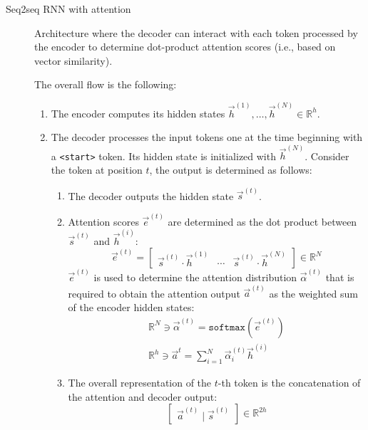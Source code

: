 \begin{description}
    \item[Seq2seq RNN with attention] 
        Architecture where the decoder can interact with each token processed by the encoder to determine dot-product attention scores (i.e., based on vector similarity).

        The overall flow is the following:
        \begin{enumerate}
            \item The encoder computes its hidden states $\vec{h}^{(1)}, \dots, \vec{h}^{(N)} \in \mathbb{R}^{h}$.
            \item The decoder processes the input tokens one at the time beginning with a \texttt{<start>} token. Its hidden state is initialized with $\vec{h}^{(N)}$. Consider the token at position $t$, the output is determined as follows:
            \begin{enumerate}
                \item The decoder outputs the hidden state $\vec{s}^{(t)}$.
                \item Attention scores $\vec{e}^{(t)}$ are determined as the dot product between $\vec{s}^{(t)}$ and $\vec{h}^{(i)}$:
                \[ 
                    \vec{e}^{(t)} = 
                        \begin{bmatrix}
                            \vec{s}^{(t)} \cdot \vec{h}^{(1)} & 
                            \cdots &
                            \vec{s}^{(t)} \cdot \vec{h}^{(N)} 
                        \end{bmatrix} \in \mathbb{R}^{N} 
                \]
                $\vec{e}^{(t)}$ is used to determine the attention distribution $\vec{\alpha}^{(t)}$ that is required to obtain the attention output $\vec{a}^{(t)}$ as the weighted sum of the encoder hidden states:
                \[
                    \begin{gathered}
                        \mathbb{R}^{N} \ni \vec{\alpha}^{(t)} = \texttt{softmax}(\vec{e}^{(t)}) \\
                        \mathbb{R}^{h} \ni \vec{a}^{t} = \sum_{i=1}^{N} \vec{\alpha}^{(t)}_i \vec{h}^{(i)}
                    \end{gathered}
                \]
                \item The overall representation of the $t$-th token is the concatenation of the attention and decoder output:
                \[ \begin{bmatrix} \vec{a}^{(t)} \mid \vec{s}^{(t)} \end{bmatrix} \in \mathbb{R}^{2h} \]
            \end{enumerate}
        \end{enumerate}


\end{description}
